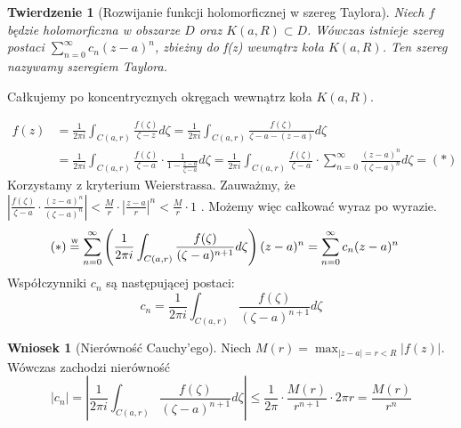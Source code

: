 \documentclass[11pt]{article}
\newcommand{\abs}[1]{\left|#1\right|} %
\newcommand{\eqtext}[1]{\overset{\text{\tiny\sffamily #1}}{=}} %
\theoremstyle{plain}
\newtheorem*{theorem}{Twierdzenie}
\theoremstyle{definition}
\newtheorem*{corollary}{Wniosek}
\theoremstyle{remark}
\let\oldendproof\endproof
\renewenvironment{proof}[1][\proofname]{
  \oldproof[\textsc{\small #1}]
}{\oldendproof}
\begin{document}
\begin{adjustbox}{valign=C,raise=0em,minipage={1.0\linewidth}}
\setlength{\columnsep}{0.5cm}
\begin{wrapfigure}{r}{4cm}
    \vspace*{-1.5em}
    \resizebox{\linewidth}{!}{}
\end{wrapfigure}
\strut{}
\vspace*{-1.9em}

\begin{theorem}[Rozwijanie funkcji holomorficznej w szereg Taylora]
  Niech $ f $ będzie holomorficzna w obszarze $ D $ oraz $ K(a, R) \subset D $. Wówczas istnieje szereg postaci $ \sum_{n = 0}^{\infty} c_{n}(z-a)^{n} $, zbieżny do f(z) wewnątrz koła $ K(a, R) $. Ten szereg nazywamy szeregiem Taylora.
\end{theorem}

\end{adjustbox}

\begin{proof}
  Całkujemy po koncentrycznych okręgach wewnątrz koła $ K(a, R) $.

  \begin{align*}
    f(z) &
    = \frac{1}{2 \pi i} \int_{C(a, r)} \frac{f(\zeta)}{\zeta-z} d\zeta
    = \frac{1}{2 \pi i} \int_{C(a, r)} \frac{f(\zeta)}{\zeta-a-(z-a)} d\zeta \\ &
    = \frac{1}{2 \pi i} \int_{C(a, r)} \frac{f(\zeta)}{\zeta-a} \cdot \frac{1}{1 - \frac{z-a}{\zeta-a}} d\zeta
    = \frac{1}{2 \pi i} \int_{C(a, r)} \frac{f(\zeta)}{\zeta-a} \cdot \sum_{n=0}^{\infty} \frac{(z-a)^{n}}{(\zeta-a)^{n}} d\zeta = (*)
  \end{align*}
  Korzystamy z kryterium Weierstrassa. Zauważmy, że
  $
    \abs{\frac{f(\zeta)}{\zeta-a} \cdot \frac{(z-a)^{n}}{(\zeta-a)^{n}}}
    < \frac{M}{r} \cdot \abs{\frac{z-a}{r}}^n
    < \frac{M}{r} \cdot 1
  $
  . Możemy więc całkować wyraz po wyrazie.
  \begin{align*}
    (*) &
    \eqtext{W} \sum_{n=0}^{\infty} \left( \frac{1}{2 \pi i} \int_{C(a, r)} \frac{f(\zeta)}{(\zeta-a)^{n+1}} d\zeta \right)(z-a)^{n}
    = \sum_{n = 0}^{\infty} c_{n}(z-a)^{n}
  \end{align*}
  Współczynniki $ c_{n} $ są następującej postaci:
  $$
    c_{n} = \frac{1}{2 \pi i} \int_{C(a, r)} \frac{f(\zeta)}{(\zeta-a)^{n+1}} d\zeta
  $$
\end{proof}

\begin{corollary}[Nierówność Cauchy'ego]
  Niech $ M(r) = \max_{\abs{z-a} = r < R} \abs{f(z)} $. Wówczas zachodzi nierówność
  $$ \abs{c_{n}} = \abs{ \frac{1}{2 \pi i} \int_{C(a, r)} \frac{f(\zeta)}{(\zeta-a)^{n+1}} d\zeta } \leq \frac{1}{2 \pi} \cdot \frac{M(r)}{r^{n+1}} \cdot 2 \pi r = \frac{M(r)}{r^n} $$
\end{corollary}
\end{document}
